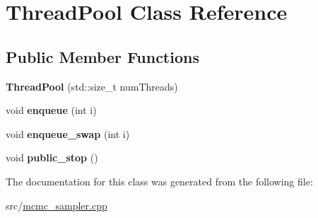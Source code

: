 \hypertarget{classThreadPool}{}\section{Thread\+Pool Class Reference}
\label{classThreadPool}
\subsection*{Public Member Functions}
\begin{DoxyCompactItemize}
\item 
\mbox{\label{classThreadPool_a9db95eb853b96e4fc832514226b4ada3}} 
{\bfseries Thread\+Pool} (std\+::size\+\_\+t num\+Threads)
\item 
\mbox{\label{classThreadPool_adbf85eec6d088b068301338e470a9723}} 
void {\bfseries enqueue} (int i)
\item 
\mbox{\label{classThreadPool_acd64225bd86aa5cf7a7889c75413167e}} 
void {\bfseries enqueue\+\_\+swap} (int i)
\item 
\mbox{\label{classThreadPool_ab85f3bf5998e7bd213326dab9895504d}} 
void {\bfseries public\+\_\+stop} ()
\end{DoxyCompactItemize}


The documentation for this class was generated from the following file\+:\begin{DoxyCompactItemize}
\item 
src/\hyperlink{mcmc__sampler_8cpp}{mcmc\+\_\+sampler.\+cpp}\end{DoxyCompactItemize}
